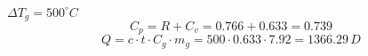 

\item[c)] \(\Delta T_g = 500^\circ C\)
    \[
    C_p = R + C_v = 0.766 + 0.633 = 0.739
    \]
    \[
    Q = c \cdot t \cdot C_g \cdot m_g = 500 \cdot 0.633 \cdot 7.92 = 1366.29 \, D
    \]